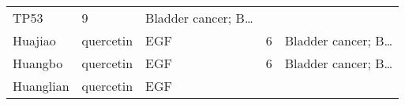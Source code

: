 \documentclass[
]{article}
\begin{document}
\begin{longtable}[]{@{}lllll@{}}
\begin{minipage}[t]{0.12\columnwidth}
TP53\strut
\end{minipage} & \begin{minipage}[t]{0.19\columnwidth}\raggedright
9\strut
\end{minipage} & \begin{minipage}[t]{0.21\columnwidth}\raggedright
Bladder cancer; B\ldots{}\strut
\end{minipage}\tabularnewline
\begin{minipage}[t]{0.17\columnwidth}\raggedright
Huajiao\strut
\end{minipage} & \begin{minipage}[t]{0.16\columnwidth}\raggedright
quercetin\strut
\end{minipage} & \begin{minipage}[t]{0.12\columnwidth}\raggedright
EGF\strut
\end{minipage} & \begin{minipage}[t]{0.19\columnwidth}\raggedright
6\strut
\end{minipage} & \begin{minipage}[t]{0.21\columnwidth}\raggedright
Bladder cancer; B\ldots{}\strut
\end{minipage}\tabularnewline
\begin{minipage}[t]{0.17\columnwidth}\raggedright
Huangbo\strut
\end{minipage} & \begin{minipage}[t]{0.16\columnwidth}\raggedright
quercetin\strut
\end{minipage} & \begin{minipage}[t]{0.12\columnwidth}\raggedright
EGF\strut
\end{minipage} & \begin{minipage}[t]{0.19\columnwidth}\raggedright
6\strut
\end{minipage} & \begin{minipage}[t]{0.21\columnwidth}\raggedright
Bladder cancer; B\ldots{}\strut
\end{minipage}\tabularnewline
\begin{minipage}[t]{0.17\columnwidth}\raggedright
Huanglian\strut
\end{minipage} & \begin{minipage}[t]{0.16\columnwidth}\raggedright
quercetin\strut
\end{minipage} & \begin{minipage}[t]{0.12\columnwidth}\raggedright
EGF\strut
\end{minipage} & \begin{minipage}[t]{0.19\columnwidth}\raggedright

\end{minipage}
\end{longtable}
\end{document}
